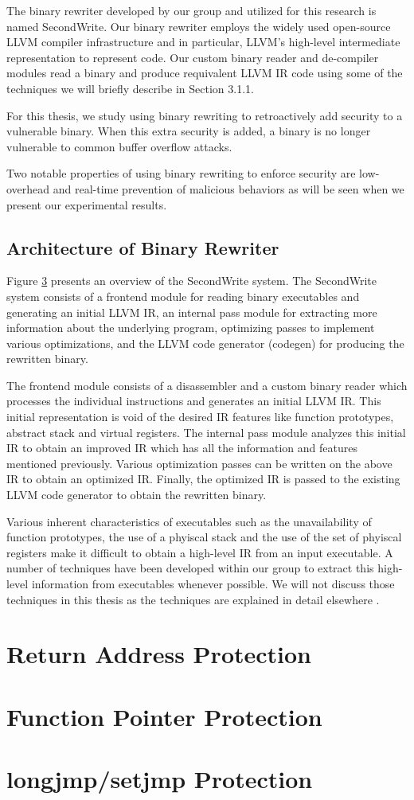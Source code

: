 The binary rewriter developed by our group and utilized for this research is named SecondWrite. Our
binary rewriter employs the widely used open-source LLVM compiler infrastructure and in particular,
LLVM's high-level intermediate representation to represent code. Our custom binary reader and
de-compiler modules read a binary and produce requivalent LLVM IR code using some of the techniques
we will briefly describe in Section 3.1.1.

For this thesis, we study using binary rewriting to retroactively add security to a vulnerable
binary. When this extra security is added, a binary is no longer vulnerable to common buffer
overflow attacks.

Two notable properties of using binary rewriting to enforce security are low-overhead and real-time
prevention of malicious behaviors as will be seen when we present our experimental results.

\subsection{Architecture of Binary Rewriter}

Figure \ref{} presents an overview of the SecondWrite system. The SecondWrite system consists of a
frontend module for reading binary executables and generating an initial LLVM IR, an internal pass
module for extracting more information about the underlying program, optimizing passes to implement
various optimizations, and the LLVM code generator (codegen) for producing the rewritten binary.

The frontend module consists of a disassembler and a custom binary reader which processes the
individual instructions and generates an initial LLVM IR. This initial representation is void of the
desired IR features like function prototypes, abstract stack and virtual registers. The internal
pass module analyzes this initial IR to obtain an improved IR which has all the information and
features mentioned previously. Various optimization passes can be written on the above IR to obtain
an optimized IR. Finally, the optimized IR is passed to the existing LLVM code generator to obtain
the rewritten binary.

Various inherent characteristics of executables such as the unavailability of function prototypes,
the use of a phyiscal stack and the use of the set of phyiscal registers make it difficult to obtain
a high-level IR from an input executable. A number of techniques have been developed within our
group to extract this high-level information from executables whenever possible. We will not discuss
those techniques in this thesis as the techniques are explained in detail elsewhere \cite{}.


\section{Return Address Protection}

\section{Function Pointer Protection}

\section{longjmp/setjmp Protection}
